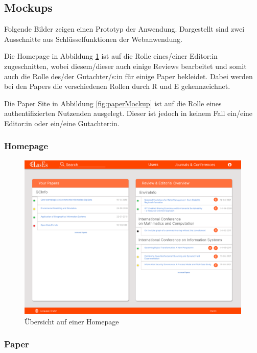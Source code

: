 \subsection{Mockups}

Folgende Bilder zeigen einen Prototyp der Anwendung.
Dargestellt sind zwei Ausschnitte aus Schlüsselfunktionen der Webanwendung.

Die Homepage in Abbildung \ref{fig:homepageMockup} ist auf die Rolle eines/einer Editor:in zugeschnitten, wobei diesem/dieser auch einige
Reviews bearbeitet und somit auch die Rolle des/der Gutachter/s:in für einige Paper bekleidet.
Dabei werden bei den Papers die verschiedenen Rollen durch R und E gekennzeichnet.

Die Paper Site in Abbildung \ref{fig:paperMockup} ist auf die Rolle eines authentifizierten Nutzenden ausgelegt.
Dieser ist jedoch in keinem Fall ein/eine Editor:in oder ein/eine Gutachter:in.


\subsubsection{Homepage}

\begin{figure}[H]
	\centering
	\includegraphics[width=0.85\linewidth]{graphics/Homepage}
	\caption{Übersicht auf einer Homepage}
	\label{fig:homepageMockup}
\end{figure}

\subsubsection{Paper}

